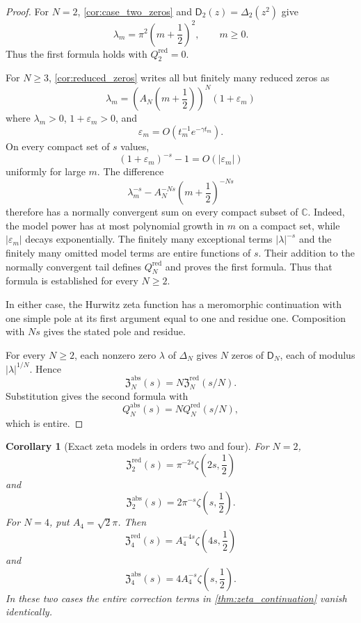 \documentclass[11pt]{article}
\newtheorem{corollary}[corollary]{Corollary}
\theoremstyle{definition}
\theoremstyle{remark}
\newcommand{\CC}{\mathbb C}
\newcommand{\Dfun}{\mathsf D}
\begin{document}
\begin{proof}
For $N=2$, \cref{cor:case_two_zeros} and
$\Dfun_2(z)=\Delta_2(z^2)$ give
\[
\lambda_m=\pi^2\left(m+\frac12\right)^2,
\qquad m\geq0.
\]
Thus the first formula holds with $Q_2^{\mathrm{red}}=0$.

For $N\geq3$, \cref{cor:reduced_zeros} writes all but finitely many reduced zeros as
\[
\lambda_m
=
\left(A_N\left(m+\frac12\right)\right)^N(1+\varepsilon_m)
\]
where $\lambda_m>0$, $1+\varepsilon_m>0$, and
\[
\varepsilon_m
=
O\left(t_m^{-1}e^{-\gamma t_m}\right).
\]
On every compact set of $s$ values,
\[
(1+\varepsilon_m)^{-s}-1
=
O(|\varepsilon_m|)
\]
uniformly for large $m$.  The difference
\[
\lambda_m^{-s}
-
A_N^{-Ns}\left(m+\frac12\right)^{-Ns}
\]
therefore has a normally convergent sum on every compact subset of
$\CC$.  Indeed, the model power has at most polynomial growth in $m$
on a compact set, while $|\varepsilon_m|$ decays exponentially.  The
finitely many exceptional terms $|\lambda|^{-s}$ and the finitely many
omitted model terms are entire functions of $s$.  Their addition to the
normally convergent tail defines $Q_N^{\mathrm{red}}$ and proves the
first formula. Thus that formula is established for every $N\geq2$.

In either case, the Hurwitz zeta function has a meromorphic continuation with one simple pole at its first argument equal to one and residue one.  Composition with $Ns$ gives the stated pole and residue.

For every $N\geq2$, each nonzero zero $\lambda$ of $\Delta_N$ gives $N$ zeros of $\Dfun_N$, each of modulus $|\lambda|^{1/N}$.  Hence
\[
\mathfrak Z_N^{\mathrm{abs}}(s)
=
N\mathfrak Z_N^{\mathrm{red}}(s/N).
\]
Substitution gives the second formula with
\[
Q_N^{\mathrm{abs}}(s)=NQ_N^{\mathrm{red}}(s/N),
\]
which is entire.
\end{proof}

\begin{corollary}[Exact zeta models in orders two and four]\label{cor:exact_zeta_models}
For $N=2$,
\[
\mathfrak Z_2^{\mathrm{red}}(s)
=
\pi^{-2s}\zeta\left(2s,\frac12\right)
\]
and
\[
\mathfrak Z_2^{\mathrm{abs}}(s)
=
2\pi^{-s}\zeta\left(s,\frac12\right).
\]
For $N=4$, put $A_4=\sqrt2\pi$.  Then
\[
\mathfrak Z_4^{\mathrm{red}}(s)
=
A_4^{-4s}\zeta\left(4s,\frac12\right)
\]
and
\[
\mathfrak Z_4^{\mathrm{abs}}(s)
=
4A_4^{-s}\zeta\left(s,\frac12\right).
\]
In these two cases the entire correction terms in \cref{thm:zeta_continuation} vanish identically.
\end{corollary}
\end{document}
